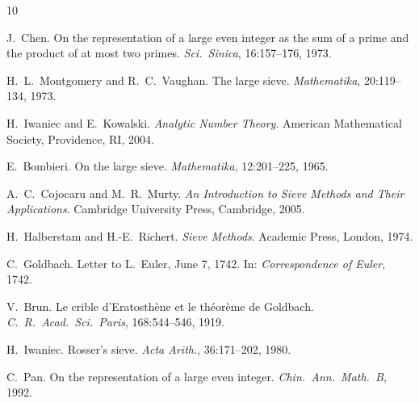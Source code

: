\documentclass[12pt,a4paper]{amsart}
\theoremstyle{definition}
\begin{document}
\begin{thebibliography}{10}

J.~Chen.
\newblock On the representation of a large even integer as the sum of a prime
  and the product of at most two primes.
\newblock \emph{Sci.\ Sinica}, 16:157--176, 1973.

H.~L.~Montgomery and R.~C.~Vaughan.
\newblock The large sieve.
\newblock \emph{Mathematika}, 20:119--134, 1973.

H.~Iwaniec and E.~Kowalski.
\newblock \emph{Analytic Number Theory}.
\newblock American Mathematical Society, Providence, RI, 2004.

E.~Bombieri.
\newblock On the large sieve.
\newblock \emph{Mathematika}, 12:201--225, 1965.

A.~C.~Cojocaru and M.~R.~Murty.
\newblock \emph{An Introduction to Sieve Methods and Their Applications}.
\newblock Cambridge University Press, Cambridge, 2005.

H.~Halberstam and H.-E.~Richert.
\newblock \emph{Sieve Methods}.
\newblock Academic Press, London, 1974.

C.~Goldbach.
\newblock Letter to L.\ Euler, June 7, 1742.
\newblock In: \emph{Correspondence of Euler}, 1742.

V.~Brun.
\newblock Le crible d'Eratosth\`{e}ne et le th\'{e}or\`{e}me de Goldbach.
\newblock \emph{C.\ R.\ Acad.\ Sci.\ Paris}, 168:544--546, 1919.

H.~Iwaniec.
\newblock Rosser's sieve.
\newblock \emph{Acta Arith.}, 36:171--202, 1980.

C.~Pan.
\newblock On the representation of a large even integer.
\newblock \emph{Chin.\ Ann.\ Math.\ B}, 1992.

\end{thebibliography}
\end{document}
